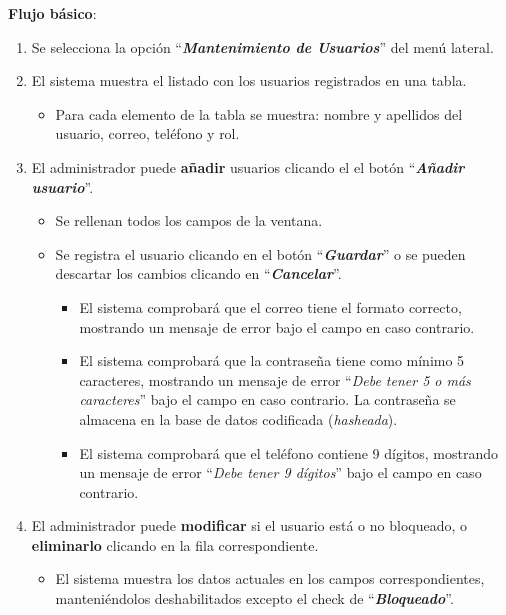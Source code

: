 \textbf{Flujo básico}:
    \begin{enumerate}
        \item Se selecciona la opción ``\textbf{\textit{Mantenimiento de Usuarios}}'' del menú lateral.
        
        \item El sistema muestra el listado con los usuarios registrados en una tabla.
            \begin{itemize}
                \item Para cada elemento de la tabla se muestra: nombre y apellidos del usuario, correo, teléfono y rol.
            \end{itemize}
            
        \item El administrador puede \textbf{añadir} usuarios clicando el el botón ``\textbf{\textit{Añadir usuario}}''.
            \begin{itemize}
            \tightlist
                \item Se rellenan todos los campos de la ventana.
                
                \item Se registra el usuario clicando en el botón ``\textbf{\textit{Guardar}}'' o se pueden descartar los cambios clicando en  ``\textbf{\textit{Cancelar}}''. 
                    \begin{itemize}
                    \tightlist
                        \item El sistema comprobará que el correo tiene el formato correcto, mostrando un mensaje de error bajo el campo en caso contrario.
                        
                        \item El sistema comprobará que la contraseña tiene como mínimo 5 caracteres, mostrando un mensaje de error ``\textit{Debe tener 5 o más caracteres}'' bajo el campo en caso contrario. La contraseña se almacena en la base de datos codificada (\textit{hasheada}).
                        
                        \item El sistema comprobará que el teléfono contiene 9 dígitos, mostrando un mensaje de error ``\textit{Debe tener 9 dígitos}'' bajo el campo en caso contrario.
                    \end{itemize}
            \end{itemize}
            
        \item El administrador puede \textbf{modificar} si el usuario está o no bloqueado, o  \textbf{eliminarlo} clicando en la fila correspondiente.
            \begin{itemize}
            \tightlist
                \item El sistema muestra los datos actuales en los campos correspondientes, manteniéndolos deshabilitados excepto el check de ``\textbf{\textit{Bloqueado}}''.
                

\end{itemize}
\end{enumerate}
